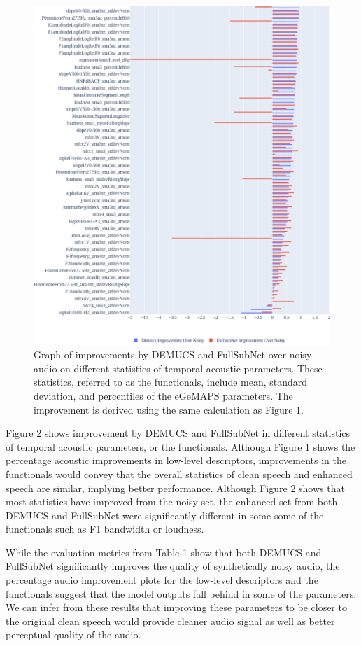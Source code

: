 \documentclass{article}
\begin{document}
\begin{figure}[h]
    \centering
    \includegraphics[width = 0.8 \textwidth]{egemaps_improvement_functionals.png}
    \caption{Graph of improvements by DEMUCS and FullSubNet over noisy audio on different statistics of temporal acoustic parameters. These statistics, referred to as the functionals, include mean, standard deviation, and percentiles of the eGeMAPS parameters. The improvement is derived using the same calculation as Figure 1.}
\end{figure}

Figure 2 shows improvement by DEMUCS and FullSubNet in different statistics of temporal acoustic parameters, or the functionals. Although Figure 1 shows the percentage acoustic improvements in low-level descriptors, improvements in the functionals would convey that the overall statistics of clean speech and enhanced speech are similar, implying better performance. Although Figure 2 shows that most statistics have improved from the noisy set, the enhanced set from both DEMUCS and FullSubNet were significantly different in some some of the functionals such as F1 bandwidth or loudness.

While the evaluation metrics from Table 1 show that both DEMUCS and FullSubNet significantly improves the quality of synthetically noisy audio, the percentage audio improvement plots for the low-level descriptors and the functionals suggest that the model outputs fall behind in some of the parameters. We can infer from these results that improving these parameters to be closer to the original clean speech would provide cleaner audio signal as well as better perceptual quality of the audio.



\end{document}
